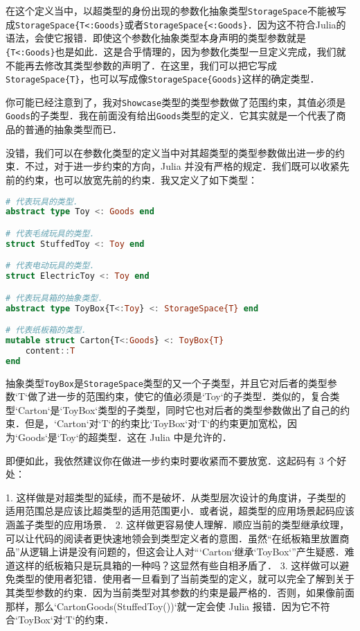在这个定义当中，以超类型的身份出现的参数化抽象类型\verb|StorageSpace|不能被写成\verb|StorageSpace{T<:Goods}|或者\verb|StorageSpace{<:Goods}|．因为这不符合Julia的语法，会使它报错．即使这个参数化抽象类型本身声明的类型参数就是\verb|{T<:Goods}|也是如此．这是合乎情理的，因为参数化类型一旦定义完成，我们就不能再去修改其类型参数的声明了．在这里，我们可以把它写成\verb|StorageSpace{T}|，也可以写成像\verb|StorageSpace{Goods}|这样的确定类型．

你可能已经注意到了，我对\verb|Showcase|类型的类型参数做了范围约束，其值必须是\verb|Goods|的子类型．我在前面没有给出\verb|Goods|类型的定义．它其实就是一个代表了商品的普通的抽象类型而已．

没错，我们可以在参数化类型的定义当中对其超类型的类型参数做出进一步的约束．不过，对于进一步约束的方向，Julia 并没有严格的规定．我们既可以收紧先前的约束，也可以放宽先前的约束．我又定义了如下类型：
\begin{lstlisting}[language=julia]
# 代表玩具的类型．
abstract type Toy <: Goods end

# 代表毛绒玩具的类型．
struct StuffedToy <: Toy end

# 代表电动玩具的类型．
struct ElectricToy <: Toy end

# 代表玩具箱的抽象类型．
abstract type ToyBox{T<:Toy} <: StorageSpace{T} end

# 代表纸板箱的类型．
mutable struct Carton{T<:Goods} <: ToyBox{T}
    content::T
end
\end{lstlisting}

抽象类型\verb|ToyBox|是\verb|StorageSpace|类型的又一个子类型，并且它对后者的类型参数`T`做了进一步的范围约束，使它的值必须是`Toy`的子类型．类似的，复合类型`Carton`是`ToyBox`类型的子类型，同时它也对后者的类型参数做出了自己的约束．但是，`Carton`对`T`的约束比`ToyBox`对`T`的约束更加宽松，因为`Goods`是`Toy`的超类型．这在 Julia 中是允许的．

即便如此，我依然建议你在做进一步约束时要收紧而不要放宽．这起码有 3 个好处：

1. 这样做是对超类型的延续，而不是破坏．从类型层次设计的角度讲，子类型的适用范围总是应该比超类型的适用范围更小．或者说，超类型的应用场景起码应该涵盖子类型的应用场景．
2. 这样做更容易使人理解．顺应当前的类型继承纹理，可以让代码的阅读者更快速地领会到类型定义者的意图．虽然“在纸板箱里放置商品”从逻辑上讲是没有问题的，但这会让人对“`Carton`继承`ToyBox`”产生疑惑．难道这样的纸板箱只是玩具箱的一种吗？这显然有些自相矛盾了．
3. 这样做可以避免类型的使用者犯错．使用者一旦看到了当前类型的定义，就可以完全了解到关于其类型参数的约束．因为当前类型对其参数的约束是最严格的．否则，如果像前面那样，那么`Carton{Goods}(StuffedToy())`就一定会使 Julia 报错．因为它不符合`ToyBox`对`T`的约束．

